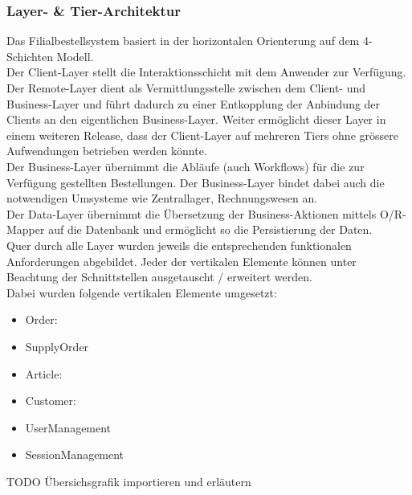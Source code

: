 \clearpage
\subsubsection{Layer- \& Tier-Architektur}
Das Filialbestellsystem basiert in der horizontalen Orienterung auf dem 4-Schichten Modell. \\
Der Client-Layer stellt die Interaktionsschicht mit dem Anwender zur Verfügung.\\
Der Remote-Layer dient als Vermittlungsstelle zwischen dem Client- und Business-Layer und führt dadurch zu einer Entkopplung der Anbindung der Clients an den eigentlichen Business-Layer. Weiter ermöglicht dieser Layer in einem weiteren Release, dass der Client-Layer auf mehreren Tiers ohne grössere Aufwendungen betrieben werden könnte.\\
Der Business-Layer übernimmt die Abläufe (auch Workflows) für die zur Verfügung gestellten Bestellungen. Der Business-Layer bindet dabei auch die notwendigen Umsysteme wie Zentrallager, Rechnungswesen an.\\
Der Data-Layer übernimmt die Übersetzung der Business-Aktionen mittels O/R-Mapper auf die Datenbank und ermöglicht so die Persistierung der Daten.\\
Quer durch alle Layer wurden jeweils die entsprechenden funktionalen Anforderungen abgebildet. Jeder der vertikalen Elemente können unter Beachtung der Schnittstellen ausgetauscht / erweitert werden.\\
Dabei wurden folgende vertikalen Elemente umgesetzt:
\begin{itemize}
	\item Order:
	\item SupplyOrder
	\item Article:
	\item Customer:
	\item UserManagement
	\item SessionManagement
\end{itemize}

TODO Übersichsgrafik importieren und erläutern

